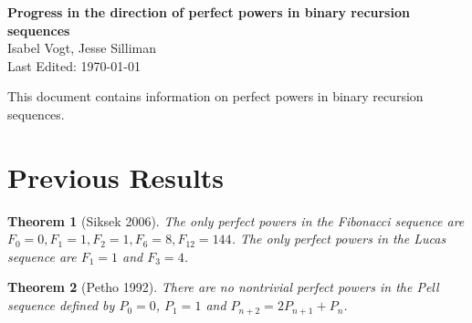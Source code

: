 \documentclass[12pt]{article}
\newtheorem{thm}{Theorem}[section]
\begin{document}
\begin{center}
{\bf \large{Progress in the direction of perfect powers in binary recursion sequences}} \\
\smallskip
Isabel Vogt, Jesse Silliman\\
Last Edited: \today \\
\end{center}

This document contains information on perfect powers in binary recursion sequences.

\section{Previous Results}


\begin{thm}[Siksek 2006]\label{fibluc}
The only perfect powers in the Fibonacci sequence are $F_0 = 0, F_1 = 1, F_2 = 1, F_6 = 8, F_{12} = 144$.  The only perfect powers in the Lucas sequence are $F_1 = 1$ and $F_3 = 4$. 
\end{thm}


\begin{thm}[Petho 1992]\label{pellseq}
There are no nontrivial perfect powers in the Pell sequence defined by $P_0 = 0$, $P_1 = 1$ and $P_{n+2} = 2P_{n+1}+P_n $.
\end{thm}
\end{document}
